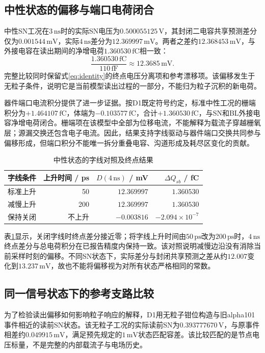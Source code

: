 \documentclass[UTF8,a4paper,zihao=-4,fontset=fandol]{ctexart}
\newcommand{\ns}{\,\mathrm{ns}}
\newcommand{\mV}{\,\mathrm{mV}}
\newcommand{\fC}{\,\mathrm{fC}}
\newcommand{\V}{\,\mathrm{V}}
\begin{document}
\subsection{中性状态的偏移与端口电荷闭合}
中性SN工况在$3\ns$时的实际SN电压为$0.500055125\V$，其封闭二电容共享预测差分仅为$0.001544\mV$，实际$4\ns$差分为$12.369997\mV$。两者之差约$12.368453\mV$，与外接电容在读出期间的净增电荷$1.360530\fC$相一致：
\begin{equation}
\frac{1.360530\fC}{110\,\mathrm{fF}}\approx12.3685\mV.
\end{equation}
完整比较同时保留式\eqref{eq:identity}的终点电压分离项和参考漂移项。该偏移发生于无粒子条件，说明它是当前模型读出过程的一部分，不能归为粒子沉积的新电荷。

器件端口电流积分提供了进一步证据。按D1既定符号约定，标准中性工况的栅端积分为$+1.464107\fC$，体端为$-0.103577\fC$，合计$+1.360530\fC$，与SN和BL外接电容净增电荷闭合。栅端项在该模型中全部为位移电流，不能解释为载流子穿越栅氧层；源漏交换还包含电子电流。因此，结果支持字线驱动与器件端口交换共同参与偏移形成，但端口积分不能唯一拆分重叠电容、沟道形成及耗尽区变化的贡献。

\begin{table}[htbp]
\centering\small
\caption{中性状态的字线对照及终点结果}
\label{tab:wl}
\begin{tabular}{@{}lrrr@{}}
\toprule
字线条件 & 上升时间 / ps & $D(4\ns)$ / mV & $\Delta Q_{sb}$ / fC\\
\midrule
标准上升 & 50 & $12.369997$ & $1.360530$\\
减慢上升 & 200 & $12.369997$ & $1.360530$\\
保持关闭 & 不上升 & $-0.003816$ & $-2.094\times10^{-7}$\\
\bottomrule
\end{tabular}
\end{table}

表\ref{tab:wl}显示，关闭字线时终点差分接近零；将字线上升时间由$50\,\mathrm{ps}$改为$200\,\mathrm{ps}$时，$4\ns$终点差分与总电荷积分在已报告精度内保持一致。该对照说明减慢边沿没有消除当前采样时刻的偏移。不同SN状态下，实际差分与封闭共享预测之差从约$12.007$变化到$13.237\mV$，故也不能将偏移视为对所有状态严格相同的常数。

\subsection{同一信号状态下的参考支路比较}
为了检验读出偏移如何影响粒子响应的解释，D1用无粒子钳位构造与旧alpha101事件相近的读前SN状态。该无粒子工况的实际读前SN为$0.393777670\V$，与原事件相差约$0.049915\mV$，满足预先规定的$1\mV$状态匹配容差。该比较匹配的是节点电压标量，不是完整的内部载流子与电场历史。
\end{document}
